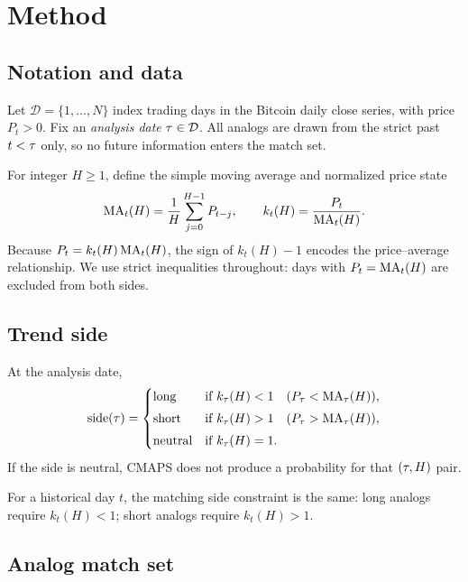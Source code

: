 \section{Method}
\label{sec:method}

\subsection{Notation and data}

Let $\mathcal{D} = \{1,\ldots,N\}$ index trading days in the Bitcoin daily close series, with price $P_t > 0$.
Fix an \emph{analysis date} $\tau \in \mathcal{D}$.
All analogs are drawn from the strict past $t < \tau$ only, so no future information enters the match set.

For integer $H \ge 1$, define the simple moving average and normalized price state
\begin{equation}
  \mathrm{MA}_t(H) = \frac{1}{H}\sum_{j=0}^{H-1} P_{t-j},
  \qquad
  k_t(H) = \frac{P_t}{\mathrm{MA}_t(H)}.
  \label{eq:k}
\end{equation}
Because $P_t = k_t(H)\,\mathrm{MA}_t(H)$, the sign of $k_t(H)-1$ encodes the price--average relationship.
We use strict inequalities throughout: days with $P_t = \mathrm{MA}_t(H)$ are excluded from both sides.

\subsection{Trend side}

At the analysis date,
\begin{equation}
  \text{side}(\tau) =
  \begin{cases}
    \text{long}  & \text{if } k_{\tau}(H) < 1 \quad (P_{\tau} < \mathrm{MA}_{\tau}(H)),\\[0.3em]
    \text{short} & \text{if } k_{\tau}(H) > 1 \quad (P_{\tau} > \mathrm{MA}_{\tau}(H)),\\[0.3em]
    \text{neutral} & \text{if } k_{\tau}(H) = 1.
  \end{cases}
  \label{eq:side}
\end{equation}
If the side is neutral, CMAPS does not produce a probability for that $(\tau,H)$ pair.

For a historical day $t$, the matching side constraint is the same: long analogs require $k_t(H) < 1$; short analogs require $k_t(H) > 1$.

\subsection{Analog match set}

